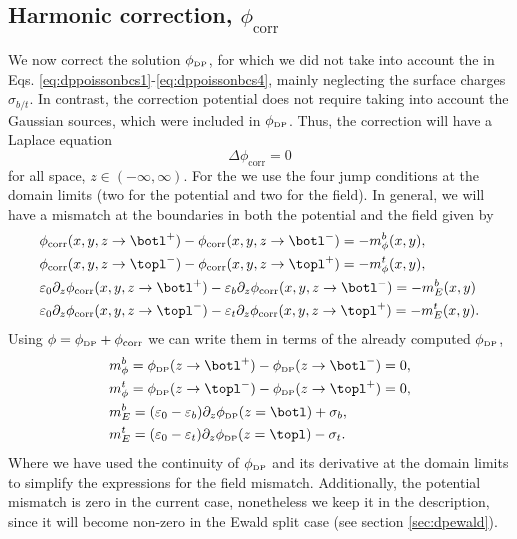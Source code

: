 \documentclass[ twoside,openright,titlepage,numbers=noenddot,%
headinclude,footinclude,cleardoublepage=empty,abstract=on,
BCOR=5mm,paper=b5,fontsize=11pt, dvipsnames
]{scrreprt}
\newcommand{\corr}{\text{corr}}
\newcommand{\dpr}{\text{\tiny DP}}
\begin{document}
\subsection{Harmonic correction, $\phi_{\corr}$}\label{sec:dpcorr}
We now correct the solution $\phi_{\dpr}$, for which we did not take into account the \bcs in Eqs. \eqref{eq:dppoissonbcs1}-\eqref{eq:dppoissonbcs4}, mainly neglecting the surface charges $\sigma_{b/t}$. In contrast, the correction potential does not require taking into account the Gaussian sources, which were included in $\phi_{\dpr}$. Thus, the correction will have a Laplace equation
\begin{equation}
  \label{eq:dppoissonlaplacecorr}
  \Delta \phi_{\corr} = 0
\end{equation}
for all space, $z\in(-\infty, \infty)$. For the \bcs we use the four jump conditions at the domain limits (two for the potential and two for the field). In general, we will have a mismatch at the boundaries in both the potential and the field given by
\begin{equation}
  \label{eq:dppoissonmismatchcorr}
  \begin{aligned}
    &\phi_{\corr}(x,y,z\rightarrow \botl^+) - \phi_{\corr}(x,y,z\rightarrow \botl^-) = -m_{\phi}^{b}(x,y),\\
    &\phi_{\corr}(x,y,z\rightarrow \topl^-) - \phi_{\corr}(x,y,z\rightarrow \topl^+) = -m_{\phi}^{t}(x,y),\\
    &\varepsilon_0\partial_z\phi_{\corr}(x,y,z\rightarrow \botl^+) - \varepsilon_{b}\partial_z\phi_{\corr}(x,y,z\rightarrow \botl^-) = -m_E^{b}(x,y)\\
    &\varepsilon_0\partial_z\phi_{\corr}(x,y,z\rightarrow \topl^-) - \varepsilon_{t}\partial_z\phi_{\corr}(x,y,z\rightarrow \topl^+) = -m_E^{t}(x,y).
  \end{aligned}
\end{equation}
Using $\phi = \phi_{\dpr} + \phi_{\corr}$ we can write them in terms of the already computed $\phi_{\dpr}$, 
\begin{equation}
  \begin{aligned}
    &m_{\phi}^{b} = \phi_{\dpr}(z\rightarrow \botl^+) - \phi_{\dpr}(z\rightarrow \botl^-) = 0,\\
    &m_{\phi}^{t} = \phi_{\dpr}(z\rightarrow \topl^-) - \phi_{\dpr}(z\rightarrow \topl^+) = 0,\\
    &m_E^{b} = (\varepsilon_0 - \varepsilon_{b})\partial_z\phi_{\dpr}(z=\botl) + \sigma_{b},\\
    &m_E^{t} = (\varepsilon_0 - \varepsilon_{t})\partial_z\phi_{\dpr}(z=\topl) - \sigma_{t}.
  \end{aligned}
\end{equation}
Where we have used the continuity of $\phi_{\dpr}$ and its derivative at the domain limits to simplify the expressions for the field mismatch. Additionally, the potential mismatch is zero in the current case, nonetheless we keep it in the description, since it will become non-zero in the Ewald split case (see section \ref{sec:dpewald}).
\end{document}
